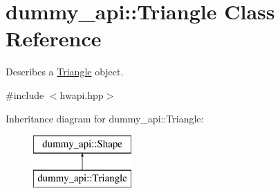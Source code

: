 \hypertarget{classdummy__api_1_1Triangle}{}\section{dummy\+\_\+api\+:\+:Triangle Class Reference}
\label{classdummy__api_1_1Triangle}


Describes a \mbox{\hyperlink{classdummy__api_1_1Triangle}{Triangle}} object.  




{\ttfamily \#include $<$hwapi.\+hpp$>$}

Inheritance diagram for dummy\+\_\+api\+:\+:Triangle\+:\begin{figure}[H]
\begin{center}
\leavevmode
\includegraphics[height=2.000000cm]{classdummy__api_1_1Triangle}
\end{center}
\end{figure}
